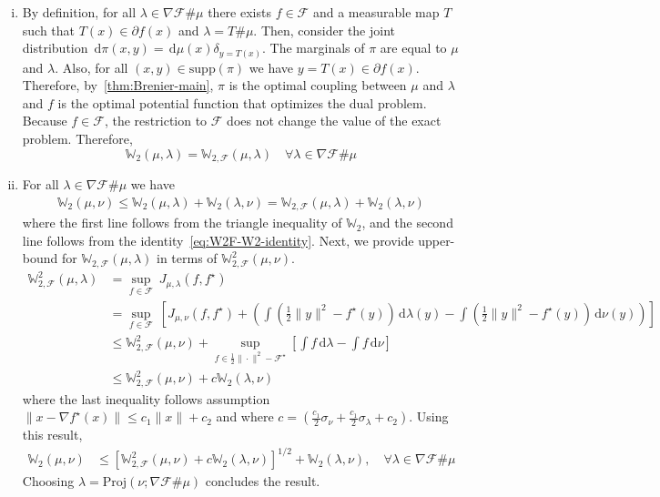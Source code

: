 \documentclass[10pt]{article}
\newcommand{\ud}{\,\mathrm{d}}
\newcommand{\norm}[1]{\|#1\|}
\newcommand{\W}{\mathds{W}}
\newcommand{\calF}{\mathcal{F}}
\numberwithin{equation}{section}
\begin{document}
\begin{enumerate}[(i)]
\item By definition, for all $\lambda \in \nabla \calF \# \mu$ there exists $f \in \calF$ and a measurable map $T$ such that $T(x) \in \partial f(x)$ and $\lambda = T\#\mu$. Then, consider the joint distribution $\ud \pi(x,y) = \ud \mu(x)\delta_{y=T(x)}$. The marginals of $\pi$ are equal to $\mu$ and $\lambda$. Also, for all $(x,y) \in \text{supp}(\pi)$ we have $y=T(x)\in \partial f(x)$. 
Therefore, by~\autoref{thm:Brenier-main}, $\pi$ is the optimal coupling between $\mu$ and $\lambda$ and $f$ is the optimal potential function that optimizes the dual problem. Because $f \in \calF$, the restriction to $\calF$ does not change the value of the exact problem. Therefore, 
\begin{equation}\label{eq:W2F-W2-identity}
\W_2(\mu,\lambda) = \W_{2,\calF}(\mu,\lambda)\quad \forall \lambda \in \nabla \calF \# \mu
\end{equation}


\item
For all $\lambda \in \nabla \calF \# \mu$ we have
\begin{align*}
\W_2(\mu,\nu)\leq \W_2(\mu,\lambda) + \W_2(\lambda ,\nu)
=\W_{2,\calF}(\mu,\lambda) + \W_2(\lambda ,\nu)
\end{align*}
where the first line follows from the triangle inequality of $\W_2$, and the second line follows from the identity~\eqref{eq:W2F-W2-identity}. 
Next, we provide upper-bound for $\W_{2,\calF}(\mu,\lambda)$ in terms of $\W_{2,\calF}^2(\mu,\nu)$.
\begin{align*}
\W_{2,\calF}^2(\mu,\lambda)&=\sup_{f \in \calF}~J_{\mu,\lambda}(f,f^\star)
\\
&=\sup_{f \in \calF}~\left[J_{\mu,\nu}(f,f^\star) + \left(\int (\frac{1}{2}\norm{y}^2-f^\star(y)) \ud \lambda(y) - \int (\frac{1}{2}\norm{y}^2-f^\star(y)) \ud \nu(y)\right)\right] \\
&\leq\W^2_{2,\calF}(\mu,\nu) + \sup_{f \in \frac{1}{2}\norm{\cdot}^2-\calF^\star}\left[\int f \ud \lambda - \int f \ud \nu\right]\\
&\leq \W^2_{2,\calF}(\mu,\nu) + c\W_2(\lambda ,\nu)
\end{align*}
where the last inequality follows assumption $\|x-\nabla f^\star(x)\|\leq c_1\|x\|+c_2$ and  \cite[Proposition 1]{polyanskiy2016wasserstein} where $c=(\frac{c_1}{2}\sigma_\nu+\frac{c_1}{2}\sigma_\lambda +c_2)$. Using this result,
\begin{align*}
\W_2(\mu,\nu)&\leq \left[ \W^2_{2,\calF}(\mu,\nu) + c\W_2(\lambda ,\nu)\right]^{1/2} + \W_2(\lambda ,\nu),\quad \forall \lambda \in \nabla \calF \#\mu
\end{align*}
Choosing $\lambda = \text{Proj}(\nu; \nabla \calF \#\mu)$ concludes the result. 
\end{enumerate}
\end{document}
